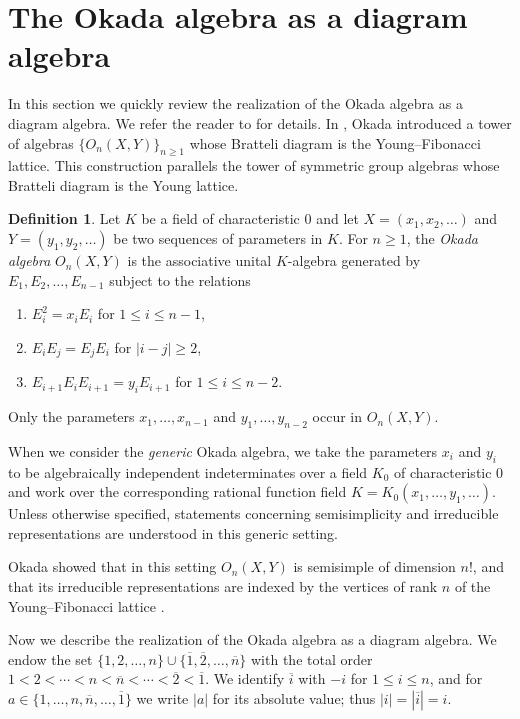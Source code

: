 \documentclass[12pt,reqno]{amsart}
\numberwithin{equation}{section}
\theoremstyle{definition}
\newtheorem{definition}[theorem]{Definition}
\theoremstyle{definition}
\begin{document}
\section{The Okada algebra as a diagram algebra}


In this section we quickly review the realization of the Okada algebra as a
diagram algebra. We refer the reader to \cite{Hivert-Scott,HivertScott} for
details. In \cite{Okada}, Okada introduced a tower of algebras
$\{O_n(X,Y)\}_{n\ge1}$ whose Bratteli diagram is the Young--Fibonacci lattice.
This construction parallels the tower of symmetric group algebras whose Bratteli diagram is the Young lattice.


\begin{definition}
Let $K$ be a field of characteristic $0$ and let
$X=(x_1,x_2,\ldots)$ and $Y=(y_1,y_2,\ldots)$ be two sequences of parameters
in $K$. For $n\ge1$, the \emph{Okada algebra} $O_n(X,Y)$ is the associative
unital $K$-algebra generated by $E_1,E_2,\ldots,E_{n-1}$ subject to the
relations
\begin{enumerate}
\item $E_i^2=x_iE_i$ for $1\le i\le n-1$,
\item $E_iE_j=E_jE_i$ for $|i-j|\ge 2$,
\item $E_{i+1}E_iE_{i+1}=y_iE_{i+1}$ for $1\le i\le n-2$.
\end{enumerate}
Only the parameters $x_1,\ldots,x_{n-1}$ and $y_1,\ldots,y_{n-2}$ occur in
$O_n(X,Y)$.
\end{definition}


When we consider the \emph{generic} Okada algebra, we take the parameters $x_i$
and $y_i$ to be algebraically independent indeterminates over a field $K_0$ of
characteristic $0$ and work over the corresponding rational function field $K=K_0(x_1,\ldots,y_1, \ldots)$.
Unless otherwise specified, statements concerning semisimplicity and
irreducible representations are understood in this generic setting.


Okada showed that in this setting $O_n(X,Y)$ is semisimple of dimension $n!$,
and that its irreducible representations are indexed by the vertices of rank
$n$ of the Young--Fibonacci lattice \cite[Theorem 2.6]{Okada}.


Now we describe the realization of the Okada algebra as a diagram algebra.
We endow the set $\{1,2,\ldots,n\}\cup\{\overline1,\overline2,\ldots,\overline n\}$ with the
total order $1<2<\cdots<n<\overline n<\cdots<\overline2<\overline1$. We identify $\overline i$
with $-i$ for $1\le i\le n$, and for
$a\in\{1,\ldots,n,\overline n,\ldots,\overline1\}$ we write $|a|$ for its absolute
value; thus $|i|=|\overline i|=i$.
\end{document}
